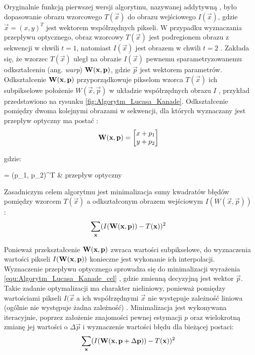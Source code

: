 Oryginalnie funkcją pierwszej wersji algorytmu, nazywanej addytywną \cite{Baker2004}, było dopasowanie obrazu wzorcowego $T(\vec{x})$ do obrazu wejściowego $I(\vec{x})$, gdzie $\vec{x} = (x, y)^T$ jest wektorem współrzędnych pikseli. W przypadku wyznaczania przepływu optycznego, obraz wzorcowy $T(\vec{x})$ jest podregionem obrazu z sekwencji w chwili $t = 1$, natomiast $I(\vec{x})$ jest obrazem w chwili $t = 2$ \cite{Baker2004}. Zakłada się, że wzorzec $T(\vec{x})$ uległ na obrazie $I(\vec{x})$ pewnemu sparametryzowanemu odkształceniu (ang. \textit{warp}) $\mathbf{W}(\mathbf{x}, \mathbf{p})$, gdzie $\vec{p}$ jest wektorem parametrów. Odkształcenie $\mathbf{W}(\mathbf{x}, \mathbf{p})$ przyporządkowuje pikselom wzorca $T(\vec{x})$ ich subpikselowe położenie $W(\vec{x}, \vec{p})$ w układzie współrzędnych obrazu $I$  \cite{Baker2004}, przykład przedstawiono na rysunku \ref{fig:Algorytm_Lucasa_Kanade}. Odkształcenie pomiędzy dwoma kolejnymi obrazami w sekwencji, dla których wyznaczany jest przepływ optyczny ma postać \cite{Baker2004}:
\begin{equation}
\label{equ:Odksztalcenie_przeplyw_optyczny}
	\mathbf{W}(\mathbf{x}, \mathbf{p}) = \begin{bmatrix}
		x + p_1 \\
		y + p_2 \\
	\end{bmatrix}
\end{equation}

\noindent
gdzie:

\begin{conditions}
	 = (p_1, p_2)^T & przepływ optyczny \\
\end{conditions}

Zasadniczym celem algorytmu jest minimalizacja sumy kwadratów błędów pomiędzy  wzorcem $T(\vec{x})$ a odkształconym obrazem wejściowym $I(W(\vec{x}, \vec{p}))$ \cite{Baker2004}:
\begin{equation}
\label{equ:Algorytm_Lucasa_Kanade_cel}
	\sum\limits_{\mathbf{x}} (I(\mathbf{W}(\mathbf{x}, \mathbf{p})) - T(\mathbf{x}))^2
\end{equation}

Ponieważ przekształcenie $\mathbf{W}(\mathbf{x}, \mathbf{p})$ zwraca wartości subpikselowe, do wyznaczenia wartości pikseli $I(\mathbf{W}(\mathbf{x}, \mathbf{p}))$ konieczne jest wykonanie ich interpolacji. Wyznaczenie przepływu optycznego sprowadza się do minimalizacji wyrażenia \ref{equ:Algorytm_Lucasa_Kanade_cel} , gdzie zmienną decyzyjną jest wektor $\vec{p}$. Takie zadanie optymalizacji ma charakter nieliniowy, ponieważ pomiędzy wartościami pikseli $I(\vec{x}$ a ich współrzędnymi $\vec{x}$ nie występuje zależność liniowa (ogólnie nie występuje żadna zależność) \cite{Baker2004}. Minimalizacja jest wykonywana iteracyjnie, poprzez założenie znajomości pewnej estymacji $p$ oraz wielokrotną zmianę jej wartości o $\Delta \vec{p}$ i wyznaczenie wartości błędu dla bieżącej postaci:
\begin{equation}
\label{equ:Algorytm_Lucasa_Kanade_iteracyjnie}
	\sum\limits_{\mathbf{x}} (I(\mathbf{W}(\mathbf{x}, \mathbf{p} + \Delta \mathbf{p})) - T(\mathbf{x}))^2
\end{equation}

